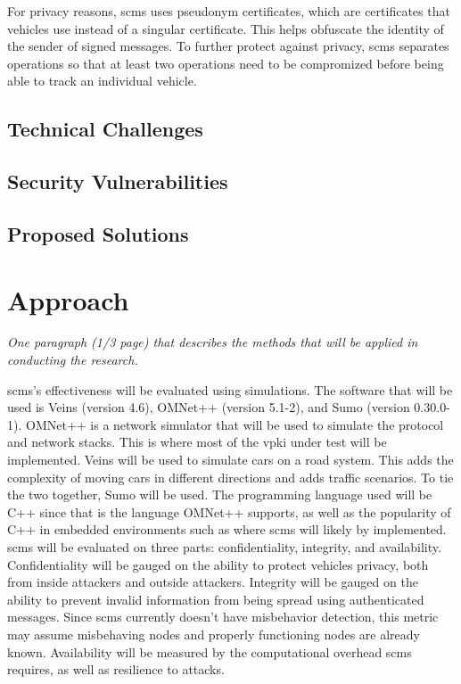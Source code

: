 \documentclass {article}
\newcommand{\sechint}[1]{\small{\emph{#1}} \bigskip}
\begin{document}
For privacy reasons, \gls{scms} uses pseudonym certificates, which are certificates that vehicles use instead of a singular certificate. This helps obfuscate the identity of the sender of signed messages. To further protect against privacy, \gls{scms} separates operations so that at least two operations need to be compromized before being able to track an individual vehicle. 


\subsection{Technical Challenges}

\subsection{Security Vulnerabilities}

\subsection{Proposed Solutions}

\section{Approach}{\sechint{One paragraph (1/3 page) that describes the methods that will be applied in conducting the research.}}

\gls{scms}'s effectiveness will be evaluated using simulations. The software that will be used is Veins (version 4.6), OMNet++ (version 5.1-2), and Sumo (version 0.30.0-1). OMNet++ is a network simulator that will be used to simulate the protocol and network stacks. This is where most of the \gls{vpki} under test will be implemented. Veins will be used to simulate cars on a road system. This adds the complexity of moving cars in different directions and adds traffic scenarios. To tie the two together, Sumo will be used.
The programming language used will be C++ since that is the language OMNet++ supports, as well as the popularity of C++ in embedded environments such as where \gls{scms} will likely by implemented. \gls{scms} will be evaluated on three parts: confidentiality, integrity, and availability. Confidentiality will be gauged on the ability to protect vehicles privacy, both from inside attackers and outside attackers. Integrity will be gauged on the ability to prevent invalid information from being spread using authenticated messages. Since \gls{scms} currently doesn't have misbehavior detection, this metric may assume misbehaving nodes and properly functioning nodes are already known. Availability will be measured by the computational overhead \gls{scms} requires, as well as resilience to attacks.
\end{document}
